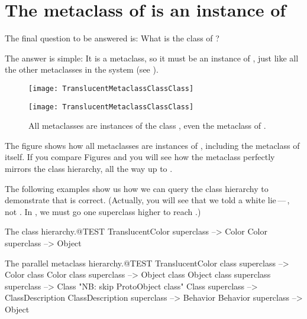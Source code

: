 \documentclass[a4paper,10pt,twoside]{book}
\begin{document}
\section{The metaclass of  is an instance of }

The final question to be answered is:
What is the class of ?

The answer is simple:
It is a metaclass, so it must be an instance of , just like all the other metaclasses in the system (see ).

\begin{center}
\begin{figure}
\ifluluelse
	{\centerline{\texttt{[image: TranslucentMetaclassClassClass]}}}
	{\centerline{\texttt{[image: TranslucentMetaclassClassClass]}}}
\caption{All metaclasses are instances of the class , even the metaclass of .\label{fig:metaclassclassclass}}
\end{figure}
\end{center}

The figure shows how all metaclasses are instances of , including the metaclass of  itself.
If you compare Figures  and  you will see how the metaclass  perfectly mirrors the class hierarchy, all the way up to .

The following examples show us how we can query the class hierarchy to demonstrate that  is correct.
(Actually, you will see that we told a white lie\,---\,, not .
In \sq, we must go one superclass higher to reach .)

\begin{example}{The class hierarchy.}{@TEST}
TranslucentColor superclass --> Color
Color superclass                   --> Object
\end{example}

\begin{example}{The parallel metaclass hierarchy.}{@TEST}
TranslucentColor class superclass   --> Color class
Color class superclass                     --> Object class
Object class superclass superclass --> Class    "NB: skip ProtoObject class"
Class superclass                              --> ClassDescription
ClassDescription superclass            --> Behavior
Behavior superclass                         --> Object
\end{example}
\end{document}
